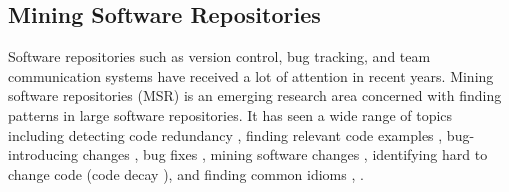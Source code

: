 \subsection{Mining Software Repositories}
Software repositories such as version control, bug tracking, and team communication systems have received a lot of attention in recent years.
Mining software repositories (MSR) is an emerging research area concerned with finding patterns in large software repositories.
It has seen a wide range of topics including detecting code redundancy \cite{Kawrykow_2009_ASE,Carzaniga_2015_ICSE}, finding relevant code examples \cite{Holmes_2005_ICSE,Sahavechaphan_2006_OOPSLA,Mandelin_2005_PLDI,Stylos_2006_VLHCC}, bug-introducing changes \cite{Sunghun_ASE_2006}, bug fixes \cite{Kim_2006_FSE,Osman_CSMR-WCRE_2014}, mining software changes \cite{Zimmermann_2005_SE,Ray_2015_MSR}, identifying hard to change code (code decay \cite{Eick_2001_SETransaction}), and finding common idioms \cite{fast_2014_CHI}, .

